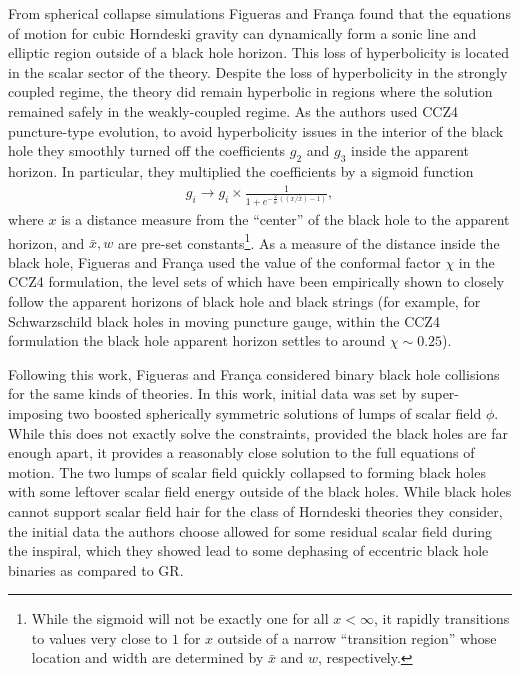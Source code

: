 \documentclass{ws-ijmpd}
\begin{document}
From spherical collapse simulations  
Figueras and Fran\c{c}a found that the equations of motion
for cubic Horndeski gravity can dynamically form
a sonic line and elliptic region outside of
a black hole horizon\cite{Figueras:2020dzx}.
This loss of hyperbolicity is located in the scalar sector of the theory.
Despite the loss of hyperbolicity in the strongly coupled regime,
the theory did remain hyperbolic in regions where the solution
remained safely in the weakly-coupled regime.
As the authors used CCZ4 puncture-type evolution\cite{Andrade:2021rbd}, 
to avoid hyperbolicity
issues in the interior of the black hole they smoothly turned
off the coefficients $g_2$ and $g_3$ inside the apparent horizon.
In particular, they multiplied the coefficients by a sigmoid function
\begin{align}
   g_i
   \to
   g_i
   \times 
   \frac{1}{1 + e^{-\frac{2}{w}\left(\left(x/\bar{x}\right)-1\right)}}
   ,
\end{align}
where $x$ is a distance measure from the ``center'' of the black hole
to the apparent horizon, 
and $\bar{x},w$ are pre-set constants\footnote{While the sigmoid will
not be exactly one for all $x<\infty$, it rapidly transitions
to values very close to $1$ for $x$ outside of a narrow
``transition region'' whose location and width are
determined by $\bar{x}$ and $w$, respectively.}.
As a measure of the distance inside the black hole,
Figueras and Fran\c{c}a used the value of the conformal
factor $\chi$ in the CCZ4 formulation, the level sets of
which have been empirically shown to closely follow the
apparent horizons of black hole and black 
strings\cite{Bantilan:2019bvf,Andrade:2020dgc}
(for example, for Schwarzschild black holes in moving
puncture gauge, within the CCZ4 formulation the
black hole apparent horizon settles to around 
$\chi\sim0.25$\cite{Figueras:2020dzx}).

Following this work, Figueras and Fran\c{c}a considered
binary black hole collisions for the same kinds of 
theories\cite{Figueras:2021abd}.
In this work, initial data was set by super-imposing two boosted 
spherically symmetric solutions of lumps of scalar field $\phi$. 
While this does not exactly
solve the constraints, provided the black holes are far enough
apart, it provides a reasonably close solution to the full
equations of motion.
The two lumps of scalar field quickly collapsed to forming black holes
with some leftover scalar field energy outside of the black holes.
While black holes cannot support scalar field hair for the class of
Horndeski theories they consider\cite{Hui:2012qt,Maselli:2015yva}, 
the initial data the authors choose allowed
for some residual scalar field during the inspiral, which they showed 
lead to some dephasing of eccentric black hole binaries
as compared to GR\cite{Figueras:2021abd}.
\end{document}

